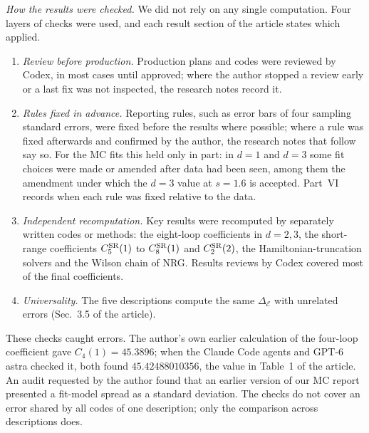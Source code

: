 \documentclass[11pt]{article}
\newcommand{\DE}{\Delta_{\mathcal E}}
\newcommand{\CfourOne}{45.42488010356}       %
\newcommand{\CfourOneOld}{45.3896}   %
\begin{document}
\textit{How the results were checked.} We did not rely on any single computation. Four layers of checks were used, and each result section of the article states which applied.
\begin{enumerate}
\item \emph{Review before production.} Production plans and codes were reviewed by Codex, in most cases until approved; where the author stopped a review early or a last fix was not inspected, the research notes record it.
\item \emph{Rules fixed in advance.} Reporting rules, such as error bars of four sampling standard errors, were fixed before the results where possible; where a rule was fixed afterwards and confirmed by the author, the research notes that follow say so. For the MC fits this held only in part: in $d=1$ and $d=3$ some fit choices were made or amended after data had been seen, among them the amendment under which the $d=3$ value at $s=1.6$ is accepted. Part~VI records when each rule was fixed relative to the data.
\item \emph{Independent recomputation.} Key results were recomputed by separately written codes or methods: the eight-loop coefficients in $d=2,3$, the short-range coefficients $C^{\rm SR}_5(1)$ to $C^{\rm SR}_8(1)$ and $C^{\rm SR}_2(2)$, the Hamiltonian-truncation solvers and the Wilson chain of NRG. Results reviews by Codex covered most of the final coefficients.
\item \emph{Universality.} The five descriptions compute the same $\DE$ with unrelated errors (Sec.~3.5 of the article).
\end{enumerate}
These checks caught errors. The author's own earlier calculation of the four-loop coefficient gave $C_4(1)=\CfourOneOld$; when the Claude Code agents and GPT-6 astra checked it, both found $\CfourOne$, the value in Table~1 of the article. An audit requested by the author found that an earlier version of our MC report presented a fit-model spread as a standard deviation. The checks do not cover an error shared by all codes of one description; only the comparison across descriptions does.
\end{document}
